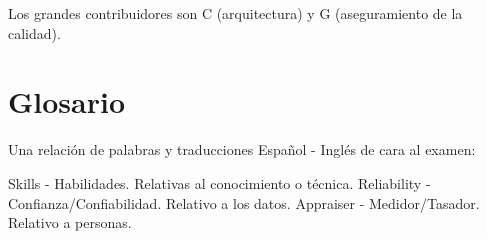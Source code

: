 \documentclass[]{article}
\begin{document}
Los grandes contribuidores son C (arquitectura) y G (aseguramiento de la calidad).


\pagebreak[4]
\part{Glosario}

Una relación de palabras y traducciones Español - Inglés de cara al examen:

Skills - Habilidades. Relativas al conocimiento o técnica.
Reliability - Confianza/Confiabilidad. Relativo a los datos.
Appraiser - Medidor/Tasador. Relativo a personas.
\end{document}
